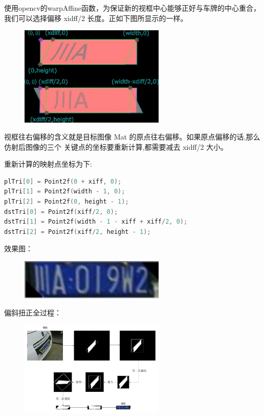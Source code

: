 \begin{enumerate}
使用opencv的warpAffine函数，为保证新的视框中心能够正好与车牌的中心重合，我们可以选择偏移 xidff/2 长度。正如下图所显示的一样。 
\begin{figure}[H]
    \centering 
    \includegraphics[width=0.618\textwidth]{image/2_6_4_6.jpg}    
    \label{logic}
\end{figure}
视框往右偏移的含义就是目标图像 Mat 的原点往右偏移。如果原点偏移的话,那么仿射后图像的三个 关键点的坐标要重新计算,都需要减去 xidff/2 大小。 

重新计算的映射点坐标为下:
\begin{lstlisting}[language={C}]
plTri[0] = Point2f(0 + xiff, 0); 
plTri[1] = Point2f(width - 1, 0);
plTri[2] = Point2f(0, height - 1);
dstTri[0] = Point2f(xiff/2, 0); 
dstTri[1] = Point2f(width - 1 - xiff + xiff/2, 0);
dstTri[2] = Point2f(xiff/2, height - 1);
\end{lstlisting}
效果图：
\begin{figure}[H]
    \centering 
    \includegraphics[width=0.618\textwidth]{image/2_6_4_7.jpg}    
    \label{logic}
\end{figure}
偏斜扭正全过程：
\begin{figure}[H]
    \centering 
    \includegraphics[width=0.618\textwidth]{image/2_6_4_8.jpg}    
    \label{logic}
\end{figure}
\end{enumerate}
